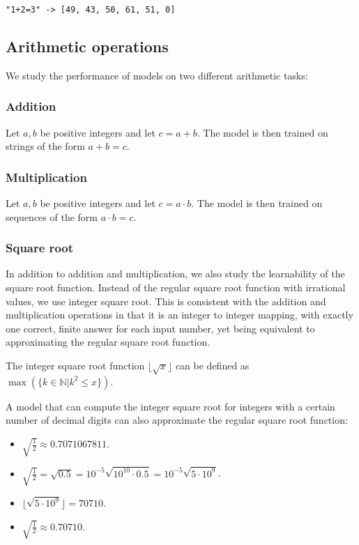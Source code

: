 \begin{lstlisting}
"1+2=3" -> [49, 43, 50, 61, 51, 0]
\end{lstlisting}

\subsection{Arithmetic operations}

We study the performance of models on two different arithmetic tasks:

\subsubsection{Addition}

Let $a, b$ be positive integers and let $c=a+b$. The model is then trained on strings of the form $a+b=c$.

\subsubsection{Multiplication}

Let $a, b$ be positive integers and let $c=a \cdot b$. The model is then trained on sequences of the form $a \cdot b=c$.

\subsubsection{Square root}

In addition to addition and multiplication, we also study the learnability of the square root function. Instead of the regular square root function with irrational values, we use integer square root. This is consistent with the addition and multiplication operations in that it is an integer to integer mapping, with exactly one correct, finite answer for each input number, yet being equivalent to approximating the regular square root function.

The integer square root function $\lfloor \sqrt{x} \rfloor$ can be defined as $\max(\{ k \in \mathbb{N} | k^2 \leq x \})$.

A model that can compute the integer square root for integers with a certain number of decimal digits can also approximate the regular square root function:

\begin{itemize}
    \item $\sqrt{\frac{1}{2}} \approx 0.7071067811$.
    \item $\sqrt{\frac{1}{2}} = \sqrt{0.5} = 10^{-5} \sqrt{10^{10} \cdot 0.5}
    = 10^{-5} \sqrt{5 \cdot 10^9}$.
    \item $\lfloor \sqrt{5 \cdot 10^9} \rfloor = 70710$.
    \item $\sqrt{\frac{1}{2}} \approx 0.70710$.
\end{itemize}

